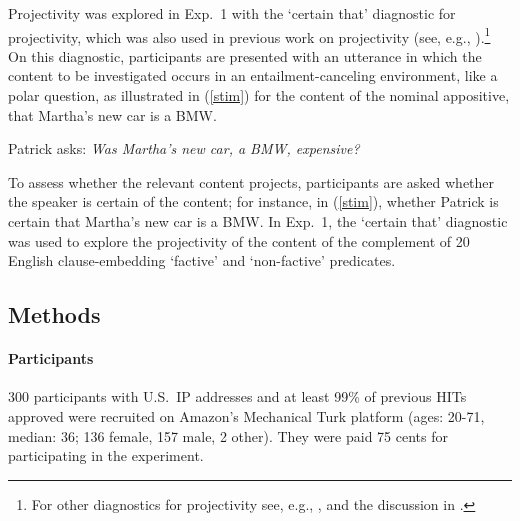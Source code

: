 \documentclass[11pt,fleqn]{article}
\newcommand{\6}{\mbox{$[\hspace*{-.6mm}[$}}
\newcommand{\9}{\mbox{$]\hspace*{-.6mm}]$}}
\begin{document}
Projectivity was explored in Exp.~1 with the `certain that' diagnostic for projectivity, which was also used in previous work on projectivity (see, e.g., \citealt{tonhauser-salt26,djaerv-bacovcin-salt27,stevens-etal2017,tbd-variability}).\footnote{For other diagnostics for projectivity see, e.g., \citealt{smith-hall11,xue-onea11,brst-lang11}, and the discussion in \citealt{tbd-variability}.} On this diagnostic, participants are presented with an utterance in which the content to be investigated occurs in an entailment-canceling environment, like a polar question, as illustrated in (\ref{stim}) for the content of the nominal appositive, that Martha's new car is a BMW.

\begin{exe}

\ex\label{stim} Patrick asks: {\em Was Martha's new car, a BMW, expensive?} 

\end{exe}
To assess whether the relevant content projects, participants are asked whether the speaker is certain of the content; for instance, in (\ref{stim}), whether Patrick is certain that Martha's new car is a BMW. In Exp.~1, the `certain that' diagnostic was used to explore the projectivity of the content of the complement of 20 English clause-embedding `factive' and `non-factive' predicates. 

\subsection{Methods}

\paragraph{Participants} 300 participants with U.S.\ IP addresses and at least 99\% of previous HITs approved were recruited on Amazon's Mechanical Turk platform (ages: 20-71, median: 36; 136 female, 157 male, 2 other). They were paid 75 cents for participating in the experiment.
\end{document}

